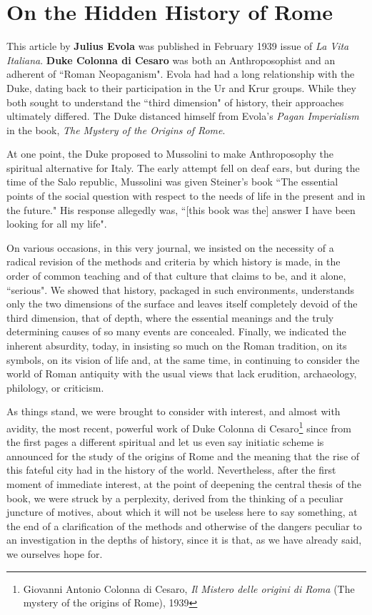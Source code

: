 \section{On the Hidden History of Rome}

\begin{quotex}
This article by \textbf{Julius Evola} was published in February 1939 issue of \emph{La Vita Italiana}. \textbf{Duke Colonna di Cesaro} was both an Anthroposophist and an adherent of ``Roman Neopaganism". Evola had had a long relationship with the Duke, dating back to their participation in the Ur and Krur groups. While they both sought to understand the ``third dimension" of history, their approaches ultimately differed. The Duke distanced himself from Evola's \emph{Pagan Imperialism} in the book, \emph{The Mystery of the Origins of Rome}.

At one point, the Duke proposed to Mussolini to make Anthroposophy the spiritual alternative for Italy. The early attempt fell on deaf ears, but during the time of the Salo republic, Mussolini was given Steiner's book ``The essential points of the social question with respect to the needs of life in the present and in the future." His response allegedly was, ``[this book was the] answer I have been looking for all my life". 

\end{quotex}
On various occasions, in this very journal, we insisted on the necessity of a radical revision of the methods and criteria by which history is made, in the order of common teaching and of that culture that claims to be, and it alone, ``serious". We showed that history, packaged in such environments, understands only the two dimensions of the surface and leaves itself completely devoid of the third dimension, that of depth, where the essential meanings and the truly determining causes of so many events are concealed. Finally, we indicated the inherent absurdity, today, in insisting so much on the Roman tradition, on its symbols, on its vision of life and, at the same time, in continuing to consider the world of Roman antiquity with the usual views that lack erudition, archaeology, philology, or criticism.

As things stand, we were brought to consider with interest, and almost with avidity, the most recent, powerful work of Duke Colonna di Cesaro\footnote{Giovanni Antonio Colonna di Cesaro, \emph{Il Mistero delle origini di Roma} (The mystery of the origins of Rome), 1939} since from the first pages a different spiritual and let us even say initiatic scheme is announced for the study of the origins of Rome and the meaning that the rise of this fateful city had in the history of the world. Nevertheless, after the first moment of immediate interest, at the point of deepening the central thesis of the book, we were struck by a perplexity, derived from the thinking of a peculiar juncture of motives, about which it will not be useless here to say something, at the end of a clarification of the methods and otherwise of the dangers peculiar to an investigation in the depths of history, since it is that, as we have already said, we ourselves hope for.

